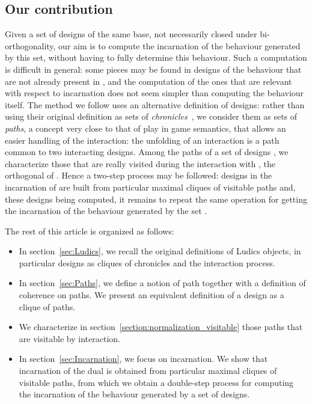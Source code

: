 \documentclass{LMCS}
\begin{document}
{\subsection{Our contribution}

Given a set  of designs of the same base, not necessarily closed under bi-orthogonality, our aim is to compute the incarnation of the behaviour generated by this set, without having to fully determine this behaviour. 
Such a computation is difficult in general:
some pieces may be found in designs of the behaviour that are not already present in , and the computation of the ones that are relevant with respect to incarnation does not seem simpler than computing the behaviour itself. 
The method we follow uses an alternative definition of designs: rather than using their original definition as sets of {\it chronicles}~\cite{DBLP:journals/mscs/Girard01}, 
we consider them as sets of {\em paths}, a concept very close to that of play in game semantics, that allows an easier handling of the interaction: the unfolding of an interaction is a path common to two interacting designs. 
Among the paths of a set of designs , we characterize those that are really visited during the interaction with , the orthogonal of . 
Hence a two-step process may be followed:
designs in the incarnation of  are built from particular maximal cliques of visitable paths and, these designs being computed, it remains to repeat the same operation for getting the incarnation of the behaviour generated by the set .

The rest of this article is organized as follows:
\begin{itemize}
\item In section~\ref{sec:Ludics}, we recall the original definitions of Ludics objects, in particular designs as cliques of chronicles and the interaction process.
\item In section~\ref{sec:Paths}, we define a notion of path together with a definition of coherence on paths. We present an equivalent definition of a design as a clique of paths. 
\item We characterize in section~\ref{section:normalization_visitable} those paths that are visitable by interaction.
\item In section~\ref{sec:Incarnation}, we focus on incarnation. We show that incarnation of the dual is obtained from particular maximal cliques of visitable paths, from which we obtain a double-step process for computing the incarnation of the behaviour generated by a set of designs. 
\end{itemize}
}
\end{document}
